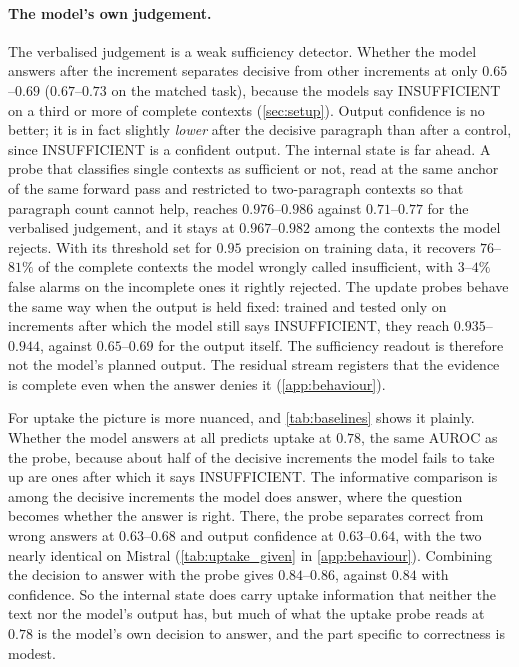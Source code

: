 \paragraph{The model's own judgement.}
The verbalised judgement is a weak sufficiency detector. Whether the model answers after the increment separates decisive from other increments at only $0.65$--$0.69$ ($0.67$--$0.73$ on the matched task), because the models say INSUFFICIENT on a third or more of complete contexts (\cref{sec:setup}). Output confidence is no better; it is in fact slightly \emph{lower} after the decisive paragraph than after a control, since INSUFFICIENT is a confident output. The internal state is far ahead. A probe that classifies single contexts as sufficient or not, read at the same anchor of the same forward pass and restricted to two-paragraph contexts so that paragraph count cannot help, reaches $0.976$--$0.986$ against $0.71$--$0.77$ for the verbalised judgement, and it stays at $0.967$--$0.982$ among the contexts the model rejects. With its threshold set for $0.95$ precision on training data, it recovers $76$--$81\%$ of the complete contexts the model wrongly called insufficient, with $3$--$4\%$ false alarms on the incomplete ones it rightly rejected. The update probes behave the same way when the output is held fixed: trained and tested only on increments after which the model still says INSUFFICIENT, they reach $0.935$--$0.944$, against $0.65$--$0.69$ for the output itself. The sufficiency readout is therefore not the model's planned output. The residual stream registers that the evidence is complete even when the answer denies it (\cref{app:behaviour}).

For uptake the picture is more nuanced, and \cref{tab:baselines} shows it plainly. Whether the model answers at all predicts uptake at $0.78$, the same AUROC as the probe, because about half of the decisive increments the model fails to take up are ones after which it says INSUFFICIENT. The informative comparison is among the decisive increments the model does answer, where the question becomes whether the answer is right. There, the probe separates correct from wrong answers at $0.63$--$0.68$ and output confidence at $0.63$--$0.64$, with the two nearly identical on Mistral (\cref{tab:uptake_given} in \cref{app:behaviour}). Combining the decision to answer with the probe gives $0.84$--$0.86$, against $0.84$ with confidence. So the internal state does carry uptake information that neither the text nor the model's output has, but much of what the uptake probe reads at $0.78$ is the model's own decision to answer, and the part specific to correctness is modest.
